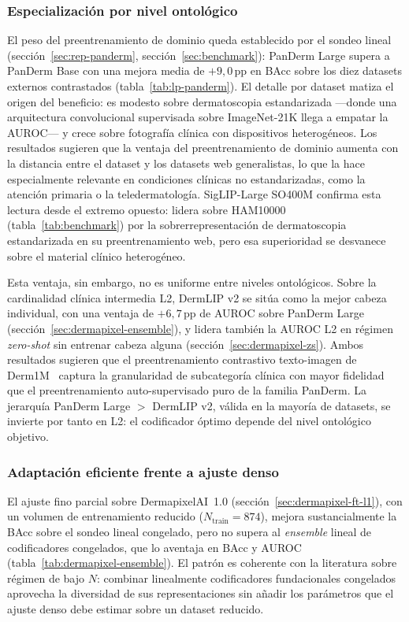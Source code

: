 \subsubsection{Especialización por nivel ontológico}
\label{sec:disc-nivel-ontologico}

El peso del preentrenamiento de dominio queda establecido por el
sondeo lineal (sección~\ref{sec:rep-panderm},
sección~\ref{sec:benchmark}): PanDerm Large supera a PanDerm Base con
una mejora media de $+9{,}0$\,pp en BAcc sobre los diez datasets
externos contrastados (tabla~\ref{tab:lp-panderm}). El detalle por
dataset matiza el origen del beneficio: es modesto sobre dermatoscopia
estandarizada ---donde una arquitectura convolucional supervisada
sobre ImageNet-21K llega a empatar la AUROC--- y crece sobre
fotografía clínica con dispositivos heterogéneos. Los resultados
sugieren que la ventaja del preentrenamiento de dominio aumenta con la
distancia entre el dataset y los datasets web generalistas, lo que la
hace especialmente relevante en condiciones clínicas no
estandarizadas, como la atención primaria o la teledermatología.
SigLIP-Large SO400M confirma esta lectura desde el extremo opuesto:
lidera sobre HAM10000 (tabla~\ref{tab:benchmark}) por la
sobrerrepresentación de dermatoscopia estandarizada en su
preentrenamiento web, pero esa superioridad se desvanece sobre el
material clínico heterogéneo.

Esta ventaja, sin embargo, no es uniforme entre niveles ontológicos.
Sobre la cardinalidad clínica intermedia L2, DermLIP v2 se sitúa como
la mejor cabeza individual, con una ventaja de $+6{,}7$\,pp de AUROC
sobre PanDerm Large (sección~\ref{sec:dermapixel-ensemble}), y lidera
también la AUROC L2 en régimen \emph{zero-shot} sin entrenar cabeza
alguna (sección~\ref{sec:dermapixel-zs}). Ambos resultados sugieren
que el preentrenamiento contrastivo texto-imagen de
Derm1M~\cite{derm1m} captura la granularidad de subcategoría clínica
con mayor fidelidad que el preentrenamiento auto-supervisado puro de
la familia PanDerm. La jerarquía PanDerm Large $>$ DermLIP v2, válida
en la mayoría de datasets, se invierte por tanto en L2: el codificador
óptimo depende del nivel ontológico objetivo.

\subsubsection{Adaptación eficiente frente a ajuste denso}
\label{sec:disc-lora-vs-ft}

El ajuste fino parcial sobre DermapixelAI~1.0
(sección~\ref{sec:dermapixel-ft-l1}), con un volumen de entrenamiento
reducido ($N_{\mathrm{train}} = 874$), mejora sustancialmente la BAcc
sobre el sondeo lineal congelado, pero no supera al \emph{ensemble}
lineal de codificadores congelados, que lo aventaja en BAcc y AUROC
(tabla~\ref{tab:dermapixel-ensemble}). El patrón es coherente con la
literatura sobre régimen de bajo $N$: combinar linealmente
codificadores fundacionales congelados aprovecha la diversidad de sus
representaciones sin añadir los parámetros que el ajuste denso debe
estimar sobre un dataset reducido.


